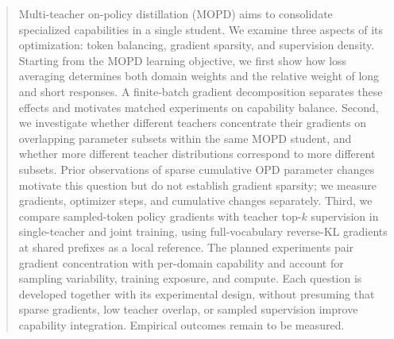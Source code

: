 \begin{abstract}
Multi-teacher on-policy distillation (MOPD) aims to consolidate specialized
capabilities in a single student. We examine three aspects of its
optimization: token balancing, gradient sparsity, and supervision
density. Starting from the MOPD learning objective, we first show how
loss averaging determines both domain weights and the relative weight
of long and short responses. A finite-batch gradient decomposition
separates these effects and motivates matched experiments on capability
balance. Second, we investigate whether different teachers concentrate
their gradients on overlapping parameter subsets within the same MOPD
student, and whether more different teacher distributions correspond to
more different subsets. Prior observations of sparse cumulative OPD
parameter changes motivate this question but do not establish gradient
sparsity; we measure gradients, optimizer steps, and cumulative changes
separately. Third, we compare sampled-token policy gradients with
teacher top-$k$ supervision in single-teacher and joint training,
using full-vocabulary reverse-KL gradients at shared prefixes as a
local reference. The planned experiments pair gradient concentration
with per-domain capability and account for sampling variability,
training exposure, and compute. Each question is developed together
with its experimental design, without presuming that sparse gradients,
low teacher overlap, or sampled supervision improve capability
integration. Empirical outcomes remain to be measured.
\end{abstract}
